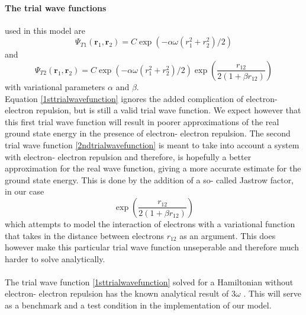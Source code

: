 \documentclass[10pt,a4paper]{article}
\begin{document}
\paragraph{The trial wave functions} used in this model are \begin{equation}\label{1sttrialwavefunction}
\Psi_{T1}(\mathbf{r}_1,\mathbf{r}_2) = C\exp{\left(-\alpha\omega(r_1^2+r_2^2)/2\right)}
\end{equation}
and
\begin{equation}\label{2ndtrialwavefunction}
\Psi_{T2}(\mathbf{r}_1,\mathbf{r}_2) =
    C\exp{\left(-\alpha\omega(r_1^2+r_2^2)/2\right)}
    \exp{\left(\frac{r_{12}}{2(1+\beta r_{12})}\right)}
\end{equation}
with variational parameters $\alpha$ and $\beta$.\\Equation \eqref{1sttrialwavefunction} ignores the added complication of electron- electron repulsion, but is still a valid trial wave function. We expect however that this first trial wave function will result in poorer approximations of the real ground state energy in the presence of electron- electron repulsion. The second trial wave function \eqref{2ndtrialwavefunction} is meant to take into account a system with electron- electron repulsion and therefore, is hopefully a better approximation for the real wave function, giving a more accurate estimate for the ground state energy. This is done by the addition of a so- called Jastrow factor, in our case 
\begin{equation}\label{jastrow}
\exp{\left(\frac{r_{12}}{2(1+\beta r_{12})}\right)}
\end{equation}
which attempts to model the interaction of electrons with a variational function that takes in the distance between electrons $r_{12}$ as an argument. This does however make this particular trial wave function unseperable and therefore much harder to solve analytically.\\\\The trial wave function \eqref{1sttrialwavefunction} solved for a Hamiltonian without electron- electron repulsion has the known analytical result of $3\omega$ \cite{Problem_set_5}. This will serve as a benchmark and a test condition in the implementation of our model.
\end{document}
